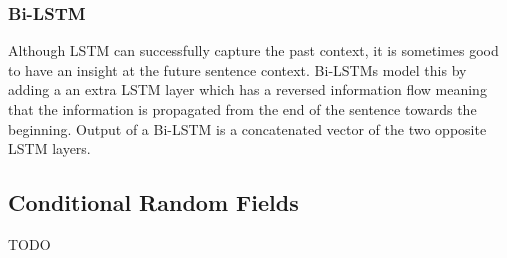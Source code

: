 \subsubsection{Bi-LSTM}
Although LSTM can successfully capture the past context, it is sometimes good
to have an insight at the future sentence context. Bi-LSTMs \cite{bilstm} model
this by adding a an extra LSTM layer which has a reversed information flow
meaning that the information is propagated from the end of the sentence towards
the beginning. Output of a Bi-LSTM is a concatenated vector of the two opposite
LSTM layers.

\subsection{Conditional Random Fields}
TODO



